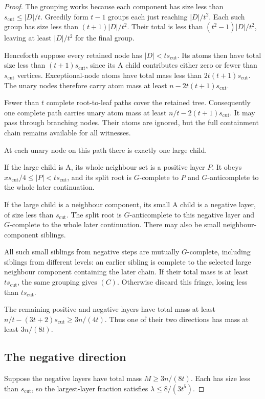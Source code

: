 \documentclass[11pt,a4paper]{article}
\theoremstyle{definition}
\theoremstyle{remark}
\numberwithin{equation}{section}
\begin{document}
\begin{proof}
The grouping works because each component has size less than \(s_{\mathrm{cut}}\le\allowbreak |D|/t\). Greedily form \(t-1\) groups each just reaching \(|D|/t^{2}\). Each such group has size less than \((t+1)|D|/t^{2}\). Their total is less than \((t^{2}-1)|D|/t^{2}\), leaving at least \(|D|/t^{2}\) for the final group.

Henceforth suppose every retained node has \(|D|<ts_{\mathrm{cut}}\). Its atoms then have total size less than \((t+1)s_{\mathrm{cut}}\), since its A child contributes either zero or fewer than \(s_{\mathrm{cut}}\) vertices. Exceptional-node atoms have total mass less than \(2t(t+1)s_{\mathrm{cut}}\). The unary nodes therefore carry atom mass at least \(n-2t(t+1)s_{\mathrm{cut}}\).

Fewer than \(t\) complete root-to-leaf paths cover the retained tree. Consequently one complete path carries unary atom mass at least \(n/t-2(t+1)s_{\mathrm{cut}}\). It may pass through branching nodes. Their atoms are ignored, but the full containment chain remains available for all witnesses.

At each unary node on this path there is exactly one large child.

If the large child is A, its whole neighbour set is a positive layer \(P\). It obeys \(xs_{\mathrm{cut}}/4 \le\allowbreak  |P| < ts_{\mathrm{cut}}\), and its split root is \(G\)-complete to \(P\) and \(G\)-anticomplete to the whole later continuation.

If the large child is a neighbour component, its small A child is a negative layer, of size less than \(s_{\mathrm{cut}}\). The split root is \(G\)-anticomplete to this negative layer and \(G\)-complete to the whole later continuation. There may also be small neighbour-component siblings.

All such small siblings from negative steps are mutually \(G\)-complete, including siblings from different levels: an earlier sibling is complete to the selected large neighbour component containing the later chain. If their total mass is at least \(ts_{\mathrm{cut}}\), the same grouping gives \((C)\). Otherwise discard this fringe, losing less than \(ts_{\mathrm{cut}}\).

The remaining positive and negative layers have total mass at least \(n/t-(3t+2)s_{\mathrm{cut}} \ge\allowbreak  3n/(4t)\). Thus one of their two directions has mass at least \(3n/(8t)\).
\subsection{The negative direction}\label{subsec:rp6-negative}
Suppose the negative layers have total mass \(M\ge\allowbreak 3n/(8t)\). Each has size less than \(s_{\mathrm{cut}}\), so the largest-layer fraction satisfies \(\lambda \le\allowbreak  8/(3t^{5})\).


\end{proof}
\end{document}

